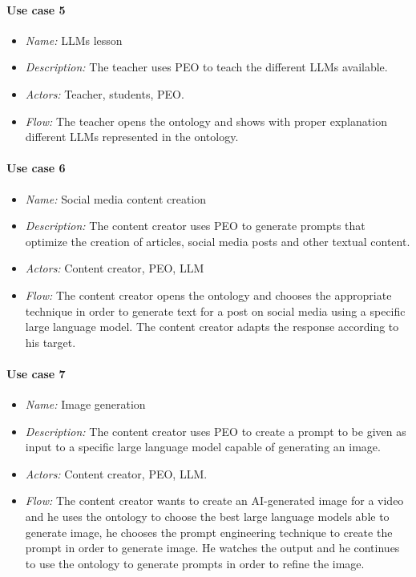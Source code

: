 \paragraph{Use case 5}
\begin{itemize}
    \item \textit{Name:} LLMs lesson
    \item \textit{Description:} The teacher uses PEO to teach the different LLMs available.
    \item \textit{Actors:} Teacher, students, PEO.
    \item \textit{Flow:} The teacher opens the ontology and shows with proper explanation different LLMs represented in the ontology. 
\end{itemize}
\paragraph{Use case 6}
\begin{itemize}
    \item \textit{Name:} Social media content creation
    \item \textit{Description:} The content creator uses PEO to generate prompts that optimize the creation of articles, social media posts and other textual content.
    \item \textit{Actors:}  Content creator, PEO, LLM
    \item \textit{Flow:} The content creator opens the ontology and chooses the appropriate technique in order to generate text for a post on social media using a specific large language model. The content creator adapts the response according to his target.
\end{itemize}



\paragraph{Use case 7}
\begin{itemize}
    \item \textit{Name:} Image generation
    \item \textit{Description:} The content creator uses PEO to create a prompt to be given as input to a specific large language model capable of generating an image.
    \item \textit{Actors:} Content creator, PEO, LLM.
    \item \textit{Flow:} The content creator wants to create an AI-generated image for a video and he uses the ontology to choose the best large language models able to generate image, he chooses the prompt engineering technique to create the prompt in order to generate image. He watches the output and he continues to use the ontology to generate prompts in order to refine the image.
\end{itemize}

